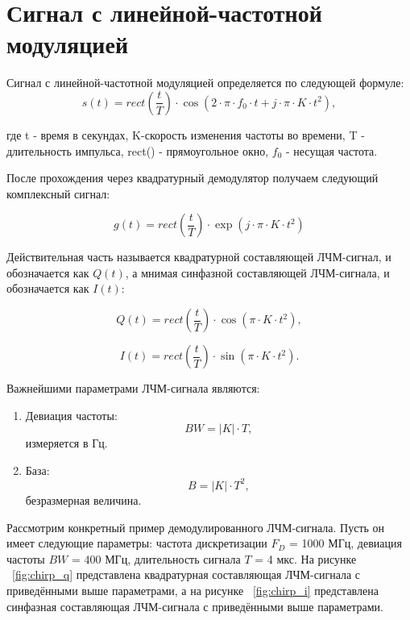 \section{Сигнал с линейной-частотной модуляцией}

Сигнал с линейной-частотной модуляцией определяется по следующей формуле:
\begin{equation}	
	s(t) = rect(\frac{t}{T}) \cdot \cos(2 \cdot \pi \cdot f_0 \cdot t + j \cdot \pi \cdot K \cdot t^{2}),
\end{equation}

где t - время в секундах, K-скорость изменения частоты во времени, T - длительность импульса, rect() - прямоугольное окно, \(f_0\) - несущая частота.

После прохождения через квадратурный демодулятор получаем следующий комплексный сигнал:

\begin{equation}	
	g(t) = rect(\frac{t}{T}) \cdot \exp(j \cdot \pi \cdot K \cdot t^{2})
\end{equation}

Действительная часть называется квадратурной
составляющей ЛЧМ-сигнал, и обозначается как \(Q(t)\), а мнимая 
синфазной составляющей ЛЧМ-сигнала, и обозначается как \(I(t)\):

\begin{equation}	
	Q(t) = rect(\frac{t}{T}) \cdot \cos(\pi \cdot K \cdot t^{2}),
\end{equation}

\begin{equation}	
	I(t) = rect(\frac{t}{T}) \cdot \sin(\pi \cdot K \cdot t^{2}).
\end{equation}

Важнейшими параметрами ЛЧМ-сигнала являются:

\begin{enumerate}
	\item Девиация частоты: 
\begin{equation}
	BW = |K| \cdot T, 
\end{equation}
измеряется в Гц.
	\item База: 
\begin{equation}
	B = |K| \cdot T^2, 
\end{equation}
безразмерная величина.
\end{enumerate}

Рассмотрим конкретный пример демодулированного ЛЧМ-сигнала. Пусть он имеет следующие параметры: частота дискретизации \(F_{D}\) = 1000 МГц, девиация частоты \(BW\) = 400 МГц, длительность сигнала \(T\) = 4 мкс. На рисунке ~\ref{fig:chirp_q} представлена квадратурная составляющая ЛЧМ-сигнала с приведёнными выше параметрами, а на рисунке ~\ref{fig:chirp_i} представлена синфазная составляющая ЛЧМ-сигнала с приведёнными выше параметрами.

